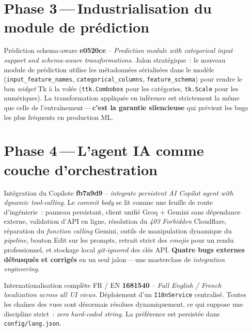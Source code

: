 \documentclass[11pt,a4paper]{report}
\begin{document}
\section{Phase 3\,---\,Industrialisation du module de pr\'ediction}

\begin{milestonebox}{Pr\'ediction \og schema-aware \fg{}}
\textbf{e0520ce} -- \textit{Prediction module with categorical input support and schema-aware transformations}.
Jalon strat\'egique~: le nouveau module de pr\'ediction utilise les
m\'etadonn\'ees s\'erialis\'ees dans le mod\`ele (\texttt{input\_feature\_names},
\texttt{categorical\_columns}, \texttt{feature\_schema}) pour rendre
le bon \textit{widget} Tk \`a la vol\'ee (\texttt{ttk.Combobox} pour
les cat\'egories, \texttt{tk.Scale} pour les num\'eriques).
La transformation appliqu\'ee en inf\'erence est strictement la
m\^eme que celle de l'entra\^inement\,---\,\textbf{c'est la garantie
silencieuse} qui pr\'evient les bugs les plus fr\'equents en
production ML.
\end{milestonebox}

\section{Phase 4\,---\,L'agent IA comme couche d'orchestration}

\begin{milestonebox}{Int\'egration du Copilote}
\textbf{fb7a9d9} -- \textit{integrate persistent AI Copilot agent with dynamic tool-calling}.
Le \textit{commit body} se lit comme une feuille de route d'ing\'enierie~:
panneau persistant, client unifi\'e Groq + Gemini sans d\'ependance
externe, validation d'API en ligne, r\'esolution du \textit{403
Forbidden} Cloudflare, r\'eparation du \textit{function calling}
Gemini, outils de manipulation dynamique du \textit{pipeline}, bouton
\og Edit \fg{} sur les prompts, retrait strict des \textit{emojis}
pour un rendu professionnel, et stockage local \textit{git-ignored}
des cl\'es API. \textbf{Quatre bugs externes d\'ebusqu\'es et
corrig\'es} en un seul jalon\,---\,une masterclass de
\textit{integration engineering}.
\end{milestonebox}

\begin{milestonebox}{Internationalisation compl\`ete FR / EN}
\textbf{1681540} -- \textit{Full English / French localization across all UI views}.
D\'eploiement d'un \texttt{I18nService} centralis\'e. Toutes les
cha\^ines des vues sont d\'esormais r\'esolues dynamiquement, ce
qui suppose une discipline strict~: \textit{zero hard-coded string}.
La pr\'ef\'erence est persist\'ee dans \texttt{config/lang.json}.
\end{milestonebox}
\end{document}
